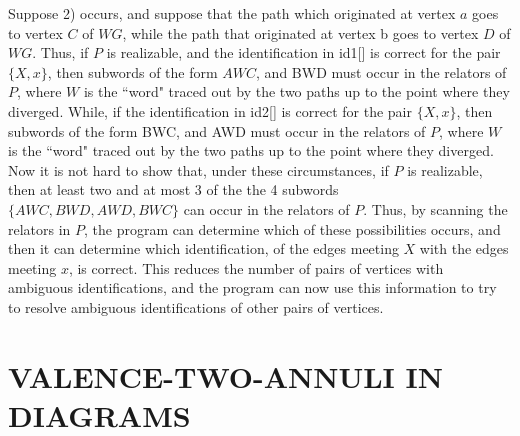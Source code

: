 \documentclass[12pt]{amsart}
\begin{document}
                Suppose 2) occurs, and suppose that the path which originated at vertex $a$ goes to
        vertex $C$ of $WG$, while the path that originated at vertex b goes to vertex $D$ of $WG$. Thus,
        if $P$ is realizable, and the identification in id1[] is correct for the pair $\{ X,x\}$, then
        subwords of the form $AWC$, and BWD must occur in the relators of $P$, where $W$ is the  ``word"
        traced out by the two paths up to the point where they diverged. While, if the
        identification in id2[] is correct for the pair $\{ X,x\}$, then        subwords of the form BWC, and
        AWD must occur in the relators of $P$, where $W$ is the  ``word" traced out by the two paths up
        to the point where they diverged.
                Now it is not hard to show that, under these circumstances, if $P$ is realizable, then
        at least two and at most 3 of the the 4 subwords  $\{ AWC, BWD, AWD, BWC\}$ can occur in the
        relators of $P$. Thus, by scanning the relators in $P$, the program can determine which of
        these possibilities occurs, and then it can determine which identification, of the edges
        meeting $X$ with the edges meeting $x$, is correct. This reduces the number of pairs of
        vertices with ambiguous identifications, and the program can now use this information to
        try to resolve ambiguous identifications of other pairs of vertices.


                                                                \section{VALENCE-TWO-ANNULI IN DIAGRAMS}
                                                                
\end{document}
